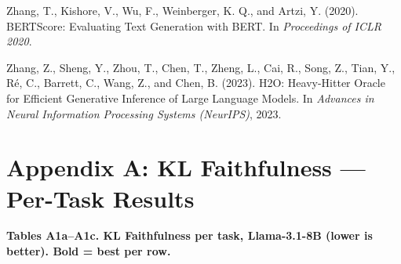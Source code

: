 \documentclass[10pt,letterpaper]{article}
\begin{document}
Zhang, T., Kishore, V., Wu, F., Weinberger, K. Q., and Artzi, Y. (2020).
BERTScore: Evaluating Text Generation with BERT. In \emph{Proceedings of
ICLR 2020}.

Zhang, Z., Sheng, Y., Zhou, T., Chen, T., Zheng, L., Cai, R., Song, Z.,
Tian, Y., Ré, C., Barrett, C., Wang, Z., and Chen, B. (2023). H2O:
Heavy-Hitter Oracle for Efficient Generative Inference of Large Language
Models. In \emph{Advances in Neural Information Processing Systems
(NeurIPS)}, 2023.


\clearpage
\onecolumn


\hypertarget{appendix-a-kl-faithfulness-per-task-results}{%
\section{Appendix A: KL Faithfulness --- Per-Task
Results}\label{appendix-a-kl-faithfulness-per-task-results}}

\textbf{Tables A1a--A1c. KL Faithfulness per task, Llama-3.1-8B (lower
is better). Bold = best per row.}
\end{document}
